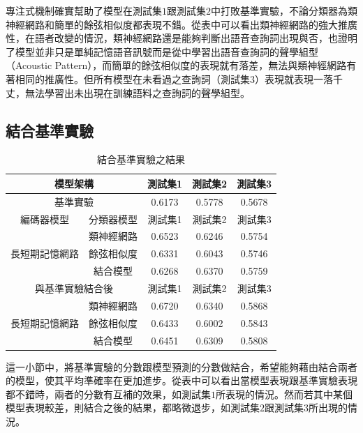 專注式機制確實幫助了模型在測試集$1$跟測試集$2$中打敗基準實驗，不論分類器為類神經網路和簡單的餘弦相似度都表現不錯。從表中可以看出類神經網路的強大推廣性，在語者改變的情況，類神經網路還是能夠判斷出語音查詢詞出現與否，也證明了模型並非只是單純記憶語音訊號而是從中學習出語音查詢詞的聲學組型（Acoustic
Pattern），而簡單的餘弦相似度的表現就有落差，無法與類神經網路有著相同的推廣性。但所有模型在未看過之查詢詞（測試集$3$）表現就表現一落千丈，無法學習出未出現在訓練語料之查詢詞的聲學組型。

\subsection{結合基準實驗}
\begin{table}[ht]
	 \centering
	 \caption{結合基準實驗之結果}
	 \label{table:ch3_late_fusion}
	 \begin{tabular}{|c|c|c|c|c|}
		 \hline
		 \multicolumn{2}{|c|}{模型架構} & 測試集1 & 測試集2 & 測試集3 \\
		 \hline
		 \multicolumn{2}{|c|}{基準實驗} & 0.6173 & 0.5778 & 0.5678\\
		 \hline
		 \hline 
		 編碼器模型 & 分類器模型 & 測試集1 &測試集2 & 測試集3 \\
		 \hline
		 \multirow{3}{*}{長短期記憶網路} & 類神經網路 &
		 0.6523 &0.6246 & 0.5754 \\
		 \cline{2-5}
		 & 餘弦相似度& 0.6331 & 0.6043 & 0.5746 \\
		 \cline{2-5}
		 & 結合模型 & 0.6268 & 0.6370 & 0.5759 \\ 
		 \hline
		 \hline
		 \multicolumn{2}{|c|}{與基準實驗結合後} & 測試集1 &測試集2
		 &測試集3 \\
		 \hline
		 \multirow{3}{*}{長短期記憶網路} & 類神經網路 &
		 {\color{red}0.6720} & 0.6340 & 0.5868\\
		 \cline{2-5}
		 & 餘弦相似度& 0.6433&0.6002&0.5843 \\
		 \cline{2-5}
		 & 結合模型 &0.6451&0.6309	&0.5808 \\
		 \hline
	   \end{tabular}
\end{table}

這一小節中，將基準實驗的分數跟模型預測的分數做結合，希望能夠藉由結合兩者的模型，使其平均準確率在更加進步。從表中可以看出當模型表現跟基準實驗表現都不錯時，兩者的分數有互補的效果，如測試集$1$所表現的情況。然而若其中某個模型表現較差，則結合之後的結果，都略微退步，如測試集$2$跟測試集$3$所出現的情況。
